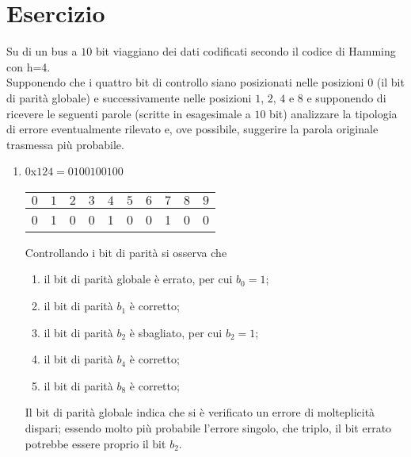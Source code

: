 \documentclass[a4paper]{extarticle}
\renewcommand\arraystretch{}
\begin{document}
\section{Esercizio}
Su di un bus a $10$ bit viaggiano dei dati codificati secondo il codice di Hamming con h=4.\\
Supponendo che i quattro bit di controllo siano posizionati nelle posizioni $0$ (il bit di parità globale) e successivamente nelle posizioni $1$, $2$, $4$ e $8$ e supponendo di ricevere le seguenti parole (scritte in esagesimale a $10$ bit) analizzare la tipologia di errore eventualmente rilevato e, ove possibile, suggerire la parola originale trasmessa più probabile.
\begin{enumerate}
    \item $0$x$124 = 01 0010 0100$

    \noindent
    \begin{table}[H]
    \setlength{\tabcolsep}{4pt}
    \renewcommand{\arraystretch}{1.2}
    \centering
    \begin{tabular}{|c|c|c|c|c|c|c|c|c|c|}
        \hline
        $0$ & $1$ & $2$ & $3$ & $4$ & $5$ & $6$ & $7$ & $8$ & $9$\\
        \hline
        \cellcolor{orange!75!white}0 & \cellcolor{orange!25!white}1 &\cellcolor{orange!25!white}0 & 0 & \cellcolor{orange!25!white}1 & 0 & 0 & 1 & \cellcolor{orange!25!white}0 & 0\\
        \hline
    \end{tabular}
    \end{table}

    \vspace{1em}
    \noindent
    Controllando i bit di parità si osserva che
    \begin{enumerate}
        \item il bit di parità globale è errato, per cui $b_0=1$;
        \item il bit di parità $b_1$ è corretto;
        \item il bit di parità $b_2$ è sbagliato, per cui $b_2=1$;
        \item il bit di parità $b_4$ è corretto;
        \item il bit di parità $b_8$ è corretto; 
    \end{enumerate}
    Il bit di parità globale indica che si è verificato un errore di molteplicità dispari; essendo molto più probabile l'errore singolo, che triplo, il bit errato potrebbe essere proprio il bit $b_2$.


\end{enumerate}
\end{document}
